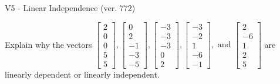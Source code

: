 \begin{exercise}
  \begin{exerciseTitle}V5 - Linear Independence (ver. 772)\end{exerciseTitle}
  \begin{exerciseStatement}
    Explain why the vectors \(\left[\begin{array}{r}
2 \\
0 \\
0 \\
5 \\
5
\end{array}\right] , \left[\begin{array}{r}
0 \\
2 \\
-1 \\
-3 \\
-5
\end{array}\right] , \left[\begin{array}{r}
-3 \\
-3 \\
-3 \\
0 \\
2
\end{array}\right] , \left[\begin{array}{r}
-3 \\
-2 \\
1 \\
-6 \\
-1
\end{array}\right] , \text{ and } \left[\begin{array}{r}
2 \\
-6 \\
1 \\
2 \\
5
\end{array}\right]\) are linearly dependent or linearly independent.	



\end{exerciseStatement}
\end{exercise}
